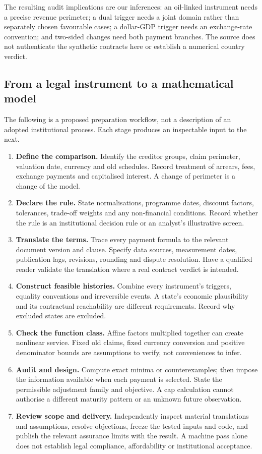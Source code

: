 \documentclass[11pt,a4paper]{article}
\begin{document}
The resulting audit implications are our inferences: an oil-linked instrument needs a precise revenue perimeter; a dual trigger needs a joint domain rather than separately chosen favourable cases; a dollar-GDP trigger needs an exchange-rate convention; and two-sided changes need both payment branches. The source does not authenticate the synthetic contracts here or establish a numerical country verdict.

\subsection{From a legal instrument to a mathematical model}
The following is a proposed preparation workflow, not a description of an adopted institutional process. Each stage produces an inspectable input to the next.
\begin{enumerate}
\item \textbf{Define the comparison.} Identify the creditor groups, claim perimeter, valuation date, currency and old schedules. Record treatment of arrears, fees, exchange payments and capitalised interest. A change of perimeter is a change of the model.
\item \textbf{Declare the rule.} State normalisations, programme dates, discount factors, tolerances, trade-off weights and any non-financial conditions. Record whether the rule is an institutional decision rule or an analyst's illustrative screen.
\item \textbf{Translate the terms.} Trace every payment formula to the relevant document version and clause. Specify data sources, measurement dates, publication lags, revisions, rounding and dispute resolution. Have a qualified reader validate the translation where a real contract verdict is intended.
\item \textbf{Construct feasible histories.} Combine every instrument's triggers, equality conventions and irreversible events. A state's economic plausibility and its contractual reachability are different requirements. Record why excluded states are excluded.
\item \textbf{Check the function class.} Affine factors multiplied together can create nonlinear service. Fixed old claims, fixed currency conversion and positive denominator bounds are assumptions to verify, not conveniences to infer.
\item \textbf{Audit and design.} Compute exact minima or counterexamples; then impose the information available when each payment is selected. State the permissible adjustment family and objective. A cap calculation cannot authorise a different maturity pattern or an unknown future observation.
\item \textbf{Review scope and delivery.} Independently inspect material translations and assumptions, resolve objections, freeze the tested inputs and code, and publish the relevant assurance limits with the result. A machine pass alone does not establish legal compliance, affordability or institutional acceptance.
\end{enumerate}
\end{document}
